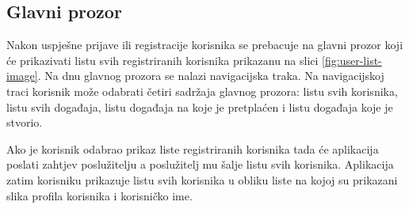 \documentclass[times, utf8, zavrsni]{fer}
\begin{document}
{\subsection{Glavni prozor}
Nakon uspješne prijave ili registracije korisnika se prebacuje na glavni prozor koji će prikazivati listu svih registriranih korisnika prikazanu na slici \ref{fig:user-list-image}. Na dnu glavnog prozora se nalazi navigacijska traka. Na navigacijskoj traci korisnik može odabrati četiri sadržaja glavnog prozora: listu svih korisnika, listu svih događaja, listu događaja na koje je pretplaćen i listu događaja koje je stvorio.

Ako je korisnik odabrao prikaz liste registriranih korisnika tada će aplikacija poslati zahtjev poslužitelju a poslužitelj mu šalje listu svih korisnika. Aplikacija zatim korisniku prikazuje listu svih korisnika u obliku liste na kojoj su prikazani slika profila korisnika i korisničko ime.

\begin{figure}
\centering


\end{figure}}
\end{document}
